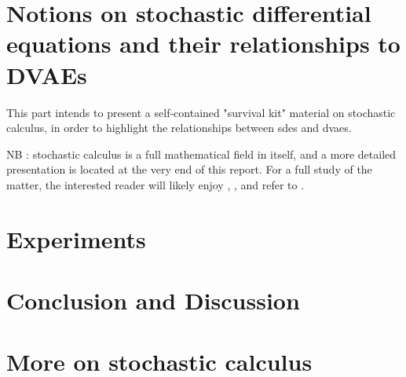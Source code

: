 \documentclass[twoside,11pt]{report}
\begin{document}
    
    
    
    
    

% 
%
%
%

\part{Notions on stochastic differential equations and their relationships to DVAEs}

This part intends to present a self-contained "survival kit" material on stochastic calculus, in order to highlight the relationships between \glspl{sde} and \glspl{dvae}.

NB : stochastic calculus is a full mathematical field in itself, and a more detailed presentation is located at the very end of this report. For a full study
of the matter, the interested reader will likely enjoy \cite{mouvement-brownien-calcul-ito}, \cite{sarkka_applied_2019}, and refer to \cite{cours-jf-legall}.

    
    
    
    

\part{Experiments}

    

\part{Conclusion and Discussion}

    

%
%
%
%
\part{More on stochastic calculus}

    
    
    

\begin{appendices}
    
\end{appendices}

\clearpage

\printglossary
\clearpage


\printbibliography
\clearpage
\end{document}
